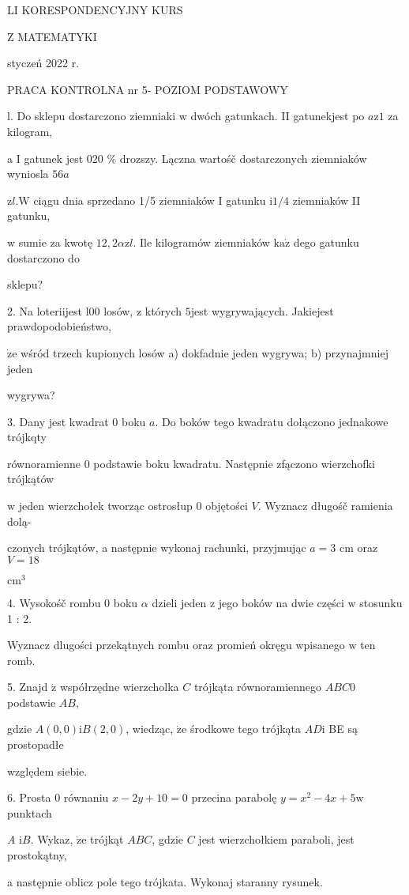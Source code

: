 \documentclass[a4paper,12pt]{article}
\begin{document}
LI KORESPONDENCYJNY KURS

Z MATEMATYKI

styczeń 2022 r.

PRACA KONTROLNA nr 5- POZIOM PODSTAWOWY

l. Do sklepu dostarczono ziemniaki $\mathrm{w}$ dwóch gatunkach. II gatunekjest po $a\mathrm{z}1$ za kilogram,

a I gatunek jest $020$ \% drozszy. Lączna wartośč dostarczonych ziemniaków wyniosla $56a$

$\mathrm{z}l. \mathrm{W}$ ciągu dnia sprzedano 1/5 ziemniaków I gatunku $\mathrm{i} 1/4$ ziemniaków II gatunku,

$\mathrm{w}$ sumie za kwotę $12,2\alpha \mathrm{z}l$. Ile kilogramów ziemniaków $\mathrm{k}\mathrm{a}\dot{\mathrm{z}}$ dego gatunku dostarczono do

sklepu?

2. Na loteriijest l00 losów, $\mathrm{z}$ których $5$jest wygrywających. Jakiejest prawdopodobieństwo,

$\dot{\mathrm{z}}\mathrm{e}$ wśród trzech kupionych losów a) dokfadnie jeden wygrywa; b) przynajmniej jeden

wygrywa?

3. Dany jest kwadrat $0$ boku $a$. Do boków tego kwadratu dołączono jednakowe trójkqty

równoramienne $0$ podstawie boku kwadratu. Następnie zfączono wierzchofki trójkątów

$\mathrm{w}$ jeden wierzchołek tworząc ostrosłup $0$ objętości $V$. Wyznacz długośč ramienia dolą-

czonych trójkątów, a następnie wykonaj rachunki, przyjmując $a=3$ cm oraz $V= 18$

$\mathrm{c}\mathrm{m}^{3}$

4. Wysokośč rombu $0$ boku $\alpha$ dzieli jeden $\mathrm{z}$ jego boków na dwie części $\mathrm{w}$ stosunku 1 : 2.

Wyznacz dlugości przekątnych rombu oraz promień okręgu wpisanego $\mathrm{w}$ ten romb.

5. Znajd $\acute{\mathrm{z}}$ współrzędne wierzcholka $C$ trójkąta równoramiennego $ABC0$ podstawie $AB,$

gdzie $A(0,0) \mathrm{i} B(2,0)$, wiedząc, $\dot{\mathrm{z}}\mathrm{e}$ środkowe tego trójkąta $AD \mathrm{i}$ BE są prostopadłe

względem siebie.

6. Prosta $0$ równaniu $x-2y+10 = 0$ przecina parabolę $y = x^{2}-4x+5\mathrm{w}$ punktach

{\it A} $\mathrm{i}B$. Wykaz, $\dot{\mathrm{z}}\mathrm{e}$ trójkąt $ABC$, gdzie $C$ jest wierzchołkiem paraboli, jest prostokątny,

a następnie oblicz pole tego trójkata. Wykonaj staranny rysunek.
\end{document}
